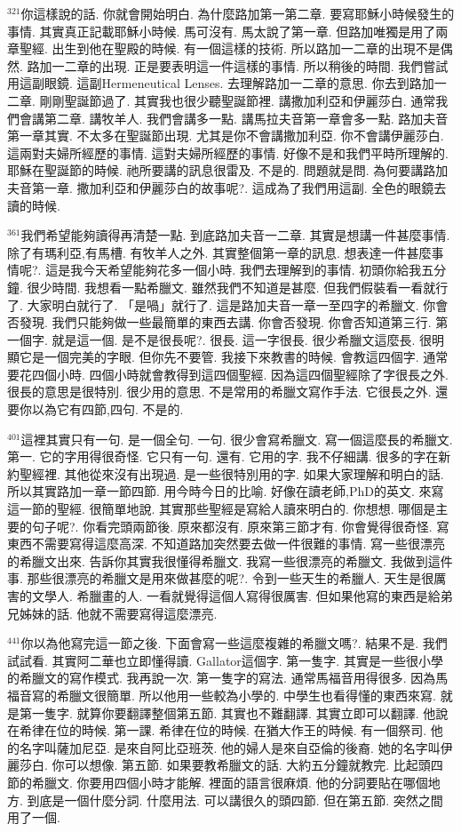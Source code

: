 \documentclass{book}
\begin{document}
$^{321}$你這樣說的話.
你就會開始明白.
為什麼路加第一第二章.
要寫耶穌小時候發生的事情.
其實真正記載耶穌小時候.
馬可沒有.
馬太說了第一章.
但路加唯獨是用了兩章聖經.
出生到他在聖殿的時候.
有一個這樣的技術.
所以路加一二章的出現不是偶然.
路加一二章的出現.
正是要表明這一件這樣的事情.
所以稍後的時間.
我們嘗試用這副眼鏡.
這副Hermeneutical Lenses.
去理解路加一二章的意思.
你去到路加一二章.
剛剛聖誕節過了.
其實我也很少聽聖誕節裡.
講撒加利亞和伊麗莎白.
通常我們會講第二章.
講牧羊人.
我們會講多一點.
講馬拉夫音第一章會多一點.
路加夫音第一章其實.
不太多在聖誕節出現.
尤其是你不會講撒加利亞.
你不會講伊麗莎白.
這兩對夫婦所經歷的事情.
這對夫婦所經歷的事情.
好像不是和我們平時所理解的.
耶穌在聖誕節的時候.
祂所要講的訊息很雷及.
不是的.
問題就是問.
為何要講路加夫音第一章.
撒加利亞和伊麗莎白的故事呢?.
這成為了我們用這副.
全色的眼鏡去讀的時候.

$^{361}$我們希望能夠讀得再清楚一點.
到底路加夫音一二章.
其實是想講一件甚麼事情.
除了有瑪利亞,有馬槽.
有牧羊人之外.
其實整個第一章的訊息.
想表達一件甚麼事情呢?.
這是我今天希望能夠花多一個小時.
我們去理解到的事情.
初頭你給我五分鐘.
很少時間.
我想看一點希臘文.
雖然我們不知道是甚麼.
但我們假裝看一看就行了.
大家明白就行了.
「是喎」就行了.
這是路加夫音一章一至四字的希臘文.
你會否發現.
我們只能夠做一些最簡單的東西去講.
你會否發現.
你會否知道第三行.
第一個字.
就是這一個.
是不是很長呢?.
很長.
這一字很長.
很少希臘文這麼長.
很明顯它是一個完美的字眼.
但你先不要管.
我接下來教書的時候.
會教這四個字.
通常要花四個小時.
四個小時就會教得到這四個聖經.
因為這四個聖經除了字很長之外.
很長的意思是很特別.
很少用的意思.
不是常用的希臘文寫作手法.
它很長之外.
還要你以為它有四節,四句.
不是的.

$^{401}$這裡其實只有一句.
是一個全句.
一句.
很少會寫希臘文.
寫一個這麼長的希臘文.
第一.
它的字用得很奇怪.
它只有一句.
還有.
它用的字.
我不仔細講.
很多的字在新約聖經裡.
其他從來沒有出現過.
是一些很特別用的字.
如果大家理解和明白的話.
所以其實路加一章一節四節.
用今時今日的比喻.
好像在讀老師,PhD的英文.
來寫這一節的聖經.
很簡單地說.
其實那些聖經是寫給人讀來明白的.
你想想.
哪個是主要的句子呢?.
你看完頭兩節後.
原來都沒有.
原來第三節才有.
你會覺得很奇怪.
寫東西不需要寫得這麼高深.
不知道路加突然要去做一件很難的事情.
寫一些很漂亮的希臘文出來.
告訴你其實我很懂得希臘文.
我寫一些很漂亮的希臘文.
我做到這件事.
那些很漂亮的希臘文是用來做甚麼的呢?.
令到一些天生的希臘人.
天生是很厲害的文學人.
希臘畫的人.
一看就覺得這個人寫得很厲害.
但如果他寫的東西是給弟兄姊妹的話.
他就不需要寫得這麼漂亮.

$^{441}$你以為他寫完這一節之後.
下面會寫一些這麼複雜的希臘文嗎?.
結果不是.
我們試試看.
其實阿二華也立即懂得讀.
Gallator這個字.
第一隻字.
其實是一些很小學的希臘文的寫作模式.
我再說一次.
第一隻字的寫法.
通常馬福音用得很多.
因為馬福音寫的希臘文很簡單.
所以他用一些較為小學的.
中學生也看得懂的東西來寫.
就是第一隻字.
就算你要翻譯整個第五節.
其實也不難翻譯.
其實立即可以翻譯.
他說在希律在位的時候.
第一課.
希律在位的時候.
在猶大作王的時候.
有一個祭司.
他的名字叫薩加尼亞.
是來自阿比亞班茨.
他的婦人是來自亞倫的後裔.
她的名字叫伊麗莎白.
你可以想像.
第五節.
如果要教希臘文的話.
大約五分鐘就教完.
比起頭四節的希臘文.
你要用四個小時才能解.
裡面的語言很麻煩.
他的分詞要貼在哪個地方.
到底是一個什麼分詞.
什麼用法.
可以講很久的頭四節.
但在第五節.
突然之間用了一個.
\end{document}
